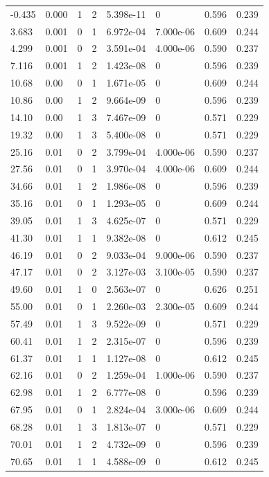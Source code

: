 \documentclass[preview]{standalone}
\begin{document}
{{\begin{tabular}{L{1.2cm}C{1.2cm} C{0.3cm}C{0.5cm} C{1.4cm}C{1.4cm} C{1.4cm}C{1.4cm}}
  -0.435  &  0.000  & 1     &  2 &  5.398e-11  & 0  & 0.596 &  0.239   \\ 
  3.683  &  0.001  & 0     &  1 &  6.972e-04  & 7.000e-06  & 0.609 &  0.244   \\ 
  4.299  &  0.001  & 0     &  2 &  3.591e-04  & 4.000e-06  & 0.590 &  0.237   \\ 
  7.116  &  0.001  & 1     &  2 &  1.423e-08  & 0  & 0.596 &  0.239   \\ 
  10.68  &  0.00  & 0     &  1 &  1.671e-05  & 0  & 0.609 &  0.244   \\ 
  10.86  &  0.00  & 1     &  2 &  9.664e-09  & 0  & 0.596 &  0.239   \\ 
  14.10  &  0.00  & 1     &  3 &  7.467e-09  & 0  & 0.571 &  0.229   \\ 
  19.32  &  0.00  & 1     &  3 &  5.400e-08  & 0  & 0.571 &  0.229   \\ 
  25.16  &  0.01  & 0     &  2 &  3.799e-04  & 4.000e-06  & 0.590 &  0.237   \\ 
  27.56  &  0.01  & 0     &  1 &  3.970e-04  & 4.000e-06  & 0.609 &  0.244   \\ 
  34.66  &  0.01  & 1     &  2 &  1.986e-08  & 0  & 0.596 &  0.239   \\ 
  35.16  &  0.01  & 0     &  1 &  1.293e-05  & 0  & 0.609 &  0.244   \\ 
  39.05  &  0.01  & 1     &  3 &  4.625e-07  & 0  & 0.571 &  0.229   \\ 
  41.30  &  0.01  & 1     &  1 &  9.382e-08  & 0  & 0.612 &  0.245   \\ 
  46.19  &  0.01  & 0     &  2 &  9.033e-04  & 9.000e-06  & 0.590 &  0.237   \\ 
  47.17  &  0.01  & 0     &  2 &  3.127e-03  & 3.100e-05  & 0.590 &  0.237   \\ 
  49.60  &  0.01  & 1     &  0 &  2.563e-07  & 0  & 0.626 &  0.251   \\ 
  55.00  &  0.01  & 0     &  1 &  2.260e-03  & 2.300e-05  & 0.609 &  0.244   \\ 
  57.49  &  0.01  & 1     &  3 &  9.522e-09  & 0  & 0.571 &  0.229   \\ 
  60.41  &  0.01  & 1     &  2 &  2.315e-07  & 0  & 0.596 &  0.239   \\ 
  61.37  &  0.01  & 1     &  1 &  1.127e-08  & 0  & 0.612 &  0.245   \\ 
  62.16  &  0.01  & 0     &  2 &  1.259e-04  & 1.000e-06  & 0.590 &  0.237   \\ 
  62.98  &  0.01  & 1     &  2 &  6.777e-08  & 0  & 0.596 &  0.239   \\ 
  67.95  &  0.01  & 0     &  1 &  2.824e-04  & 3.000e-06  & 0.609 &  0.244   \\ 
  68.28  &  0.01  & 1     &  3 &  1.813e-07  & 0  & 0.571 &  0.229   \\ 
  70.01  &  0.01  & 1     &  2 &  4.732e-09  & 0  & 0.596 &  0.239   \\ 
  70.65  &  0.01  & 1     &  1 &  4.588e-09  & 0  & 0.612 &  0.245   \\ 
\hline 
\end{tabular} 

}}
\end{document}
